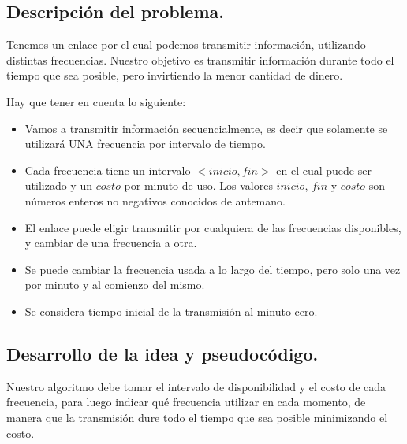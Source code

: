 \subsection{Descripción del problema.}

\vspace*{0.3cm}

Tenemos un enlace por el cual podemos transmitir información, utilizando distintas frecuencias.
Nuestro objetivo es transmitir información durante todo el tiempo que sea posible, pero invirtiendo la menor cantidad de dinero.

Hay que tener en cuenta lo siguiente:

\begin{itemize}
	\item Vamos a transmitir información secuencialmente, es decir que solamente se utilizará UNA frecuencia por intervalo de tiempo.
	\item Cada frecuencia tiene un intervalo $<inicio, fin>$ en el cual puede ser utilizado y un $costo$ por minuto de uso. Los valores $inicio$, $fin$ y $costo$ son números enteros no negativos conocidos de antemano.
	\item El enlace puede eligir transmitir por cualquiera de las frecuencias disponibles, y cambiar de una frecuencia a otra.
	\item Se puede cambiar la frecuencia usada a lo largo del tiempo, pero solo una vez por minuto y al comienzo del mismo.
	\item Se considera tiempo inicial de la transmisión al minuto cero.
\end{itemize}


\vspace*{0.6cm}

\subsection{Desarrollo de la idea y pseudocódigo.}

\vspace*{0.3cm}

Nuestro algoritmo debe tomar el intervalo de disponibilidad y el costo de cada frecuencia, para luego indicar qué frecuencia utilizar en cada momento, de manera que la transmisión dure todo el tiempo que sea posible minimizando el costo.

